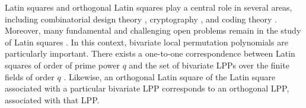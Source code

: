 \documentclass[11pt]{amsart}
\theoremstyle{plain}
\numberwithin{equation}{section}
\begin{document}
Latin squares and orthogonal Latin squares play a central role in several areas, including combinatorial design theory \cite{MM_2017}, cryptography \cite{SS_1992}, and coding theory \cite{KD_2015, MGFL_2020, WW_2014}. Moreover, many fundamental and challenging open problems remain in the study of Latin squares \cite{KD_2015}. In this context, bivariate local permutation polynomials are particularly important. There exists a one-to-one correspondence between Latin squares of order of prime power $q$ and the set of bivariate LPPs over the finite fields of order $q$ \cite{Mullen_book}. Likewise, an orthogonal Latin square of the Latin square associated with a particular bivariate LPP corresponds to an orthogonal LPP, associated with that LPP.

\end{document}
